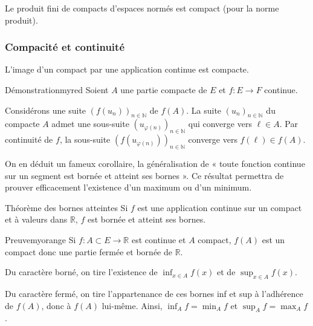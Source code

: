     \begin{prop}{}{}
        Le produit fini de compacts d’espaces normés est compact (pour la norme produit).
    \end{prop}

    \subsubsection{Compacité et continuité}

    \begin{theo}{}{}
        L’image d’un compact par une application continue est compacte.
    \end{theo}

    \begin{demo}{Démonstration}{myred}
        Soient $A$ une partie compacte de $E$ et $f : E \rightarrow F$ continue.

        Considérons une suite $\left(f(u_n)\right)_{n \in \mathbb{N}}$ de $f(A)$. La suite $(u_n)_{n \in \mathbb{N}}$ du compacte $A$ admet une sous-suite $\left(u_{\varphi(n)}\right)_{n \in \mathbb{N}}$ qui converge vers $\ell \in A$. Par continuité de $f$, la sous-suite $\left(f(u_{\varphi(n)})\right)_{n \in \mathbb{N}}$ converge vers $f(\ell) \in f(A)$.
    \end{demo}

    On en déduit un fameux corollaire, la généralisation de « toute fonction continue sur un segment est bornée et atteint ses bornes ». Ce résultat permettra de prouver efficacement l’existence d’un maximum ou d’un minimum.

    \begin{coro}{Théorème des bornes atteintes}{}
        Si $f$ est une application continue sur un compact et à valeurs dans $\mathbb{R}$, $f$ est bornée et atteint ses bornes.
    \end{coro}

    \begin{demo}{Preuve}{myorange}
        Si $f : A \subset E \rightarrow \mathbb{R}$ est continue et $A$ compact, $f(A)$ est un compact donc une partie fermée et bornée de $\mathbb{R}$. 

        Du caractère borné, on tire l’existence de $\inf_{x \in A} f(x)$ et de $\sup_{x \in A}f(x)$. 

        Du caractère fermé, on tire l’appartenance de ces bornes inf et sup à l’adhérence de $f(A)$, donc à $f(A)$ lui-même. Ainsi, $\inf_A f = \min_A f$ et $\sup_A f = \max_A f$.
    \end{demo}

